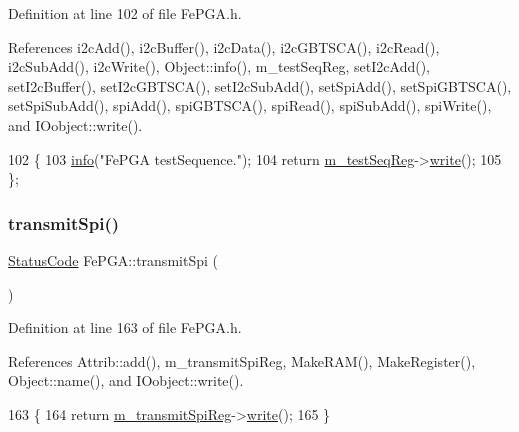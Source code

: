 Definition at line 102 of file Fe\+P\+G\+A.\+h.



References i2c\+Add(), i2c\+Buffer(), i2c\+Data(), i2c\+G\+B\+T\+S\+C\+A(), i2c\+Read(), i2c\+Sub\+Add(), i2c\+Write(), Object\+::info(), m\+\_\+test\+Seq\+Reg, set\+I2c\+Add(), set\+I2c\+Buffer(), set\+I2c\+G\+B\+T\+S\+C\+A(), set\+I2c\+Sub\+Add(), set\+Spi\+Add(), set\+Spi\+G\+B\+T\+S\+C\+A(), set\+Spi\+Sub\+Add(), spi\+Add(), spi\+G\+B\+T\+S\+C\+A(), spi\+Read(), spi\+Sub\+Add(), spi\+Write(), and I\+Oobject\+::write().


\begin{DoxyCode}
102                             \{
103     \hyperlink{classObject_a644fd329ea4cb85f54fa6846484b84a8}{info}(\textcolor{stringliteral}{"FePGA testSequence."});
104     \textcolor{keywordflow}{return} \hyperlink{classFePGA_a67bc3c8f923b673100974fd86096393e}{m\_testSeqReg}->\hyperlink{classIOobject_a9f6984bc9f0fadcf800f1be2523ac744}{write}();
105   \};
\end{DoxyCode}
\mbox{\label{classFePGA_ac7698a9f59f7290a6bb648030976597f}} 
\subsubsection{\texorpdfstring{transmit\+Spi()}{transmitSpi()}}
{\footnotesize\ttfamily \hyperlink{classStatusCode}{Status\+Code} Fe\+P\+G\+A\+::transmit\+Spi (\begin{DoxyParamCaption}{ }\end{DoxyParamCaption})\hspace{0.3cm}{\ttfamily [inline]}}



Definition at line 163 of file Fe\+P\+G\+A.\+h.



References Attrib\+::add(), m\+\_\+transmit\+Spi\+Reg, Make\+R\+A\+M(), Make\+Register(), Object\+::name(), and I\+Oobject\+::write().


\begin{DoxyCode}
163                            \{
164     \textcolor{keywordflow}{return} \hyperlink{classFePGA_a003ee241fb5f32fb3442174db3fe6f49}{m\_transmitSpiReg}->\hyperlink{classIOobject_a9f6984bc9f0fadcf800f1be2523ac744}{write}();
165   \}
\end{DoxyCode}
\mbox{\label{classFePGA_ad23605ae261d2aa0562cbb732661b2c4}} 
